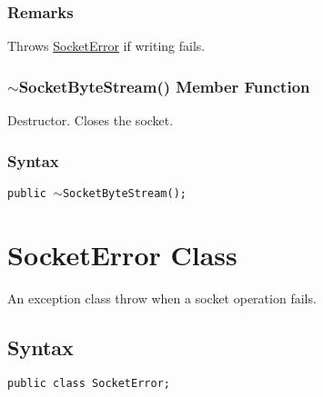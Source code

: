 \documentclass[a4paper,oneside,11.000000pt]{book}
\begin{document}
\subsubsection*{Remarks}
\begin{flushleft}
Throws \hyperlink{System.Net.Sockets.SocketError}{SocketError} if writing fails.

\end{flushleft}
\clearpage

\hypertarget{System.Net.Sockets.SocketByteStream.destructor.P.System.Net.Sockets.SocketByteStream}{\subsubsection*{$\sim$SocketByteStream() Member Function}}\begin{flushleft}
Destructor. Closes the socket.

\end{flushleft}

\subsubsection*{Syntax}\texttt{public $\sim$SocketByteStream();}
\clearpage

\hypertarget{System.Net.Sockets.SocketError}{\section{SocketError Class}}
\begin{flushleft}
An exception class throw when a socket operation fails.

\end{flushleft}
\subsection*{Syntax}\texttt{public class SocketError;}
\end{document}

